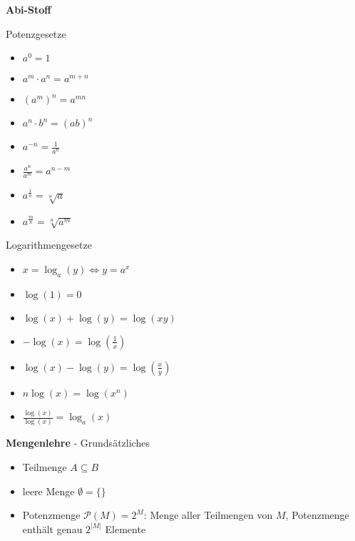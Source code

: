 \documentclass[10pt,landscape,a4paper]{article}
\begin{document}
\raggedright
\footnotesize
\begin{multicols*}{4}


\setlength{\columnseprule}{0.1pt}
\setlength{\premulticols}{1pt}
\setlength{\postmulticols}{1pt}
\setlength{\multicolsep}{1pt}
\setlength{\columnsep}{1pt}

\begin{center}
	\normalsize{\textbf{Abi-Stoff}} \\
\end{center}
Potenzgesetze
\begin{itemize}
	\item $a^0=1$
	\item $a^m\cdot a^n = a^{m+n}$
	\item $(a^m)^n = a^{mn}$
	\item $a^n\cdot b^n = (ab)^n$
	\item $a^{-n} = \frac{1}{a^n}$
	\item $\frac{a^n}{a^m} = a^{n-m}$
	\item $a^{\frac{1}{n}} = \sqrt[n]{a}$
	\item $a^{\frac{m}{n}} = \sqrt[n]{a^m}$
\end{itemize}
Logarithmengesetze
\begin{itemize}
	\item $x=\log_a(y)\Leftrightarrow y=a^x$
	\item $\log(1)=0$
	\item $\log(x) + \log(y) = \log(xy)$
	\item $-\log(x) = \log\left(\frac{1}{x}\right)$
	\item $\log(x) - \log(y) = \log\left(\frac{x}{y}\right)$
	\item $n\log(x) = \log(x^n)$
	\item $\frac{\log(x)}{\log(x)} = \log_a(x)$
\end{itemize}

\begin{center}
     \normalsize{\textbf{Mengenlehre} - Grundsätzliches} \\
\end{center}
\begin{itemize}
	\item Teilmenge $A\subseteq B$
	\item leere Menge $\emptyset = \{\}$
	\item Potenzmenge $\mathcal{P}(M) = 2^M$: Menge aller Teilmengen von $M$, Potenzmenge enthält genau $2^{\vert M\vert}$ Elemente
\end{itemize}


\end{multicols*}
\end{document}
